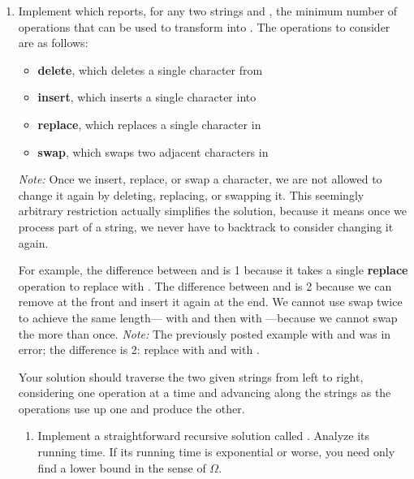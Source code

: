 \documentclass{article}
\begin{document}
\begin{enumerate}

  \newpage
  \item Implement  which reports, for any two strings
     and , the minimum number of operations that can be used
    to transform  into .  The operations to consider are as
    follows:
    \begin{itemize}
    \item \textbf{delete}, which deletes a single character from 
    \item \textbf{insert}, which inserts a single character into 
    \item \textbf{replace}, which replaces a single character in 
    \item \textbf{swap}, which swaps two adjacent characters in 
    \end{itemize}
    \emph{Note:} Once we insert, replace, or swap a character, we are not
    allowed to change it again by deleting, replacing, or swapping it.  This
    seemingly arbitrary restriction actually simplifies the solution, because it
    means once we process part of a string, we never have to backtrack to
    consider changing it again.

    For example, the difference between  and  is 1
    because it takes a single \textbf{replace} operation to replace 
    with .  The difference between  and  is 2
    because we can remove  at the front and insert it again at the
    end.  We cannot use swap twice to achieve the same length--- with
     and then  with ---because we cannot swap the
     more than once.  \emph{Note:} The previously
    posted example with  and  was in error; the
    difference is 2: replace  with  and  with
    .

    Your solution should traverse the two given strings from left to right,
    considering one operation at a time and advancing along the strings as the
    operations use up one and produce the other.

    \begin{enumerate}

    \item Implement a straightforward recursive solution called
      .  Analyze its running time.  If its running
      time is exponential or worse, you need only find a lower bound in the
      sense of \(\Omega\).


\end{enumerate}
\end{enumerate}
\end{document}
